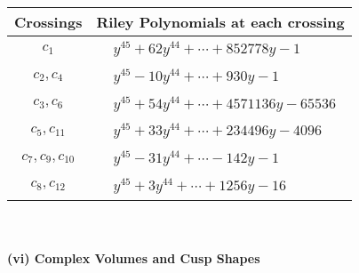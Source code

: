 \documentclass[1p]{elsarticle_modified}
\theoremstyle{definition}
\begin{document}
\begin{tabular}{m{50pt}|m{274pt}}
Crossings & \hspace{64pt}Riley Polynomials at each crossing \\
\hline $$\begin{aligned}c_{1}\end{aligned}$$&$\begin{aligned}
&y^{45}+62 y^{44}+\cdots+852778 y-1
\end{aligned}$\\
\hline $$\begin{aligned}c_{2},c_{4}\end{aligned}$$&$\begin{aligned}
&y^{45}-10 y^{44}+\cdots+930 y-1
\end{aligned}$\\
\hline $$\begin{aligned}c_{3},c_{6}\end{aligned}$$&$\begin{aligned}
&y^{45}+54 y^{44}+\cdots+4571136 y-65536
\end{aligned}$\\
\hline $$\begin{aligned}c_{5},c_{11}\end{aligned}$$&$\begin{aligned}
&y^{45}+33 y^{44}+\cdots+234496 y-4096
\end{aligned}$\\
\hline $$\begin{aligned}c_{7},c_{9},c_{10}\end{aligned}$$&$\begin{aligned}
&y^{45}-31 y^{44}+\cdots-142 y-1
\end{aligned}$\\
\hline $$\begin{aligned}c_{8},c_{12}\end{aligned}$$&$\begin{aligned}
&y^{45}+3 y^{44}+\cdots+1256 y-16
\end{aligned}$\\
\hline
\end{tabular}\\~\\
\newpage\flushleft \textbf{(vi) Complex Volumes and Cusp Shapes}
\end{document}
